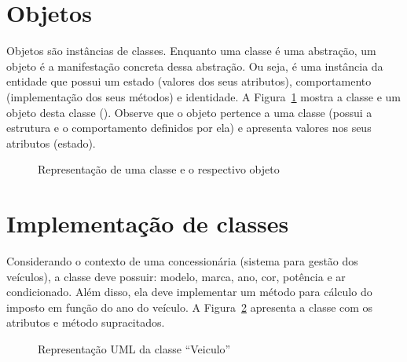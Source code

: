 \section{Objetos} 
Objetos são instâncias de classes. Enquanto uma classe é uma abstração, um objeto é a manifestação concreta dessa abstração. Ou seja, é uma instância da entidade que possui um estado (valores dos seus atributos), comportamento (implementação dos seus métodos) e identidade. A Figura~\ref{fig:classe-objeto} mostra a classe  e um objeto desta classe (). Observe que o objeto pertence a uma classe (possui a estrutura e o comportamento definidos por ela) e apresenta valores nos seus atributos (estado).

\begin{figure}[h]
	\centering
	\caption{Representação de uma classe e o respectivo objeto}
	\label{fig:classe-objeto}
\end{figure}


\section{Implementação de classes}
Considerando o contexto de uma concessionária (sistema para gestão dos veículos), a classe  deve possuir: modelo, marca, ano, cor, potência e ar condicionado. Além disso, ela deve implementar um método para cálculo do imposto em função do ano do veículo. A Figura~\ref{fig:classe-veiculo} apresenta a classe  com os atributos e método supracitados.

\begin{figure}[h]
	\centering
	\caption{Representação UML da classe ``Veiculo''}
	\label{fig:classe-veiculo}
\end{figure}

